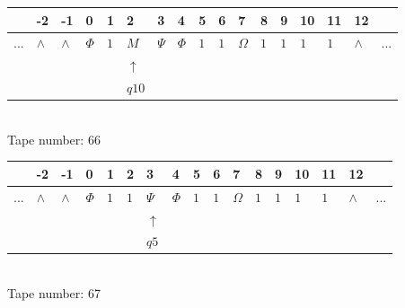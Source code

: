 \documentclass[11pt]{article}
\begin{document}
\begin{table}[H]
\centering
\begin{tabular}{lllllllllllllllll}
 & -2 & -1 & 0 & 1 & 2 & 3 & 4 & 5 & 6 & 7 & 8 & 9 & 10 & 11 & 12 & \\
\hline
$...$ & \multicolumn{1}{|l|}{$\wedge$} & \multicolumn{1}{|l|}{$\wedge$} & \multicolumn{1}{|l|}{$\Phi$} & \multicolumn{1}{|l|}{$1$} & \multicolumn{1}{|l|}{$M$} & \multicolumn{1}{|l|}{$\Psi$} & \multicolumn{1}{|l|}{$\Phi$} & \multicolumn{1}{|l|}{$1$} & \multicolumn{1}{|l|}{$1$} & \multicolumn{1}{|l|}{$\Omega$} & \multicolumn{1}{|l|}{$1$} & \multicolumn{1}{|l|}{$1$} & \multicolumn{1}{|l|}{$1$} & \multicolumn{1}{|l|}{$1$} & \multicolumn{1}{|l|}{$\wedge$} & $...$\\
\hline
&  &  &  &  & $\uparrow$ &  &  &  &  &  &  &  &  &  &  &  \\
&  &  &  &  & $ q10 $ &  &  &  &  &  &  &  &  &  &  &  \\
\end{tabular}
\\
Tape number: 66
\noindent\makebox[\linewidth]{\hdashrule{\textwidth}{1pt}{1pt}}\end{table}

\begin{table}[H]
\centering
\begin{tabular}{lllllllllllllllll}
 & -2 & -1 & 0 & 1 & 2 & 3 & 4 & 5 & 6 & 7 & 8 & 9 & 10 & 11 & 12 & \\
\hline
$...$ & \multicolumn{1}{|l|}{$\wedge$} & \multicolumn{1}{|l|}{$\wedge$} & \multicolumn{1}{|l|}{$\Phi$} & \multicolumn{1}{|l|}{$1$} & \multicolumn{1}{|l|}{$1$} & \multicolumn{1}{|l|}{$\Psi$} & \multicolumn{1}{|l|}{$\Phi$} & \multicolumn{1}{|l|}{$1$} & \multicolumn{1}{|l|}{$1$} & \multicolumn{1}{|l|}{$\Omega$} & \multicolumn{1}{|l|}{$1$} & \multicolumn{1}{|l|}{$1$} & \multicolumn{1}{|l|}{$1$} & \multicolumn{1}{|l|}{$1$} & \multicolumn{1}{|l|}{$\wedge$} & $...$\\
\hline
&  &  &  &  &  & $\uparrow$ &  &  &  &  &  &  &  &  &  &  \\
&  &  &  &  &  & $ q5 $ &  &  &  &  &  &  &  &  &  &  \\
\end{tabular}
\\
Tape number: 67
\noindent\makebox[\linewidth]{\hdashrule{\textwidth}{1pt}{1pt}}\end{table}
\end{document}
